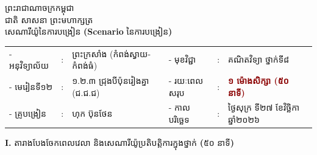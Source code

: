 \documentclass[a4paper,10pt]{article}
\newcommand{\enbf}[1]{{\TimesEn\textbf{#1}}}
\begin{document}
\fontsize{9.8pt}{14.6pt}\selectfont

\begin{center}
  {\muol\fontsize{11pt}{16pt}\selectfont ព្រះរាជាណាចក្រកម្ពុជា}\\[1pt]
  {\muol\fontsize{10pt}{15pt}\selectfont ជាតិ សាសនា ព្រះមហាក្សត្រ}\\[4pt]
  {\muol\fontsize{10.5pt}{15pt}\selectfont សេណារីយ៉ូនៃការបង្រៀន \enbf{(Scenario} នៃការបង្រៀន\enbf{)}}
\end{center}

\vspace{2pt}
{\renewcommand{\arraystretch}{1.06}
\begin{tabular}{@{}l l l p{0.6cm} l l l@{}}
  - អនុវិទ្យាល័យ & : & ព្រះក្រសាំង (កំពង់ស្វាយ-កំពង់ធំ) & & - មុខវិជ្ជា & : & គណិតវិទ្យា ថ្នាក់ទី៨ \\
  - មេរៀនទី១២ & : & ១.២.៣ ជ្រុងបីប៉ុនរៀងគ្នា (ជ.ជ.ជ) & & - រយៈពេលសរុប & : & \textcolor{darkred}{\textbf{១ ម៉ោងសិក្សា (៥០ នាទី)}} \\
  - គ្រូបង្រៀន & : & ហុក ប៊ុនថែន & & - កាលបរិច្ឆេទ & : & ថ្ងៃសុក្រ ទី២៧ ខែវិច្ឆិកា ឆ្នាំ២០២៦ \\
\end{tabular}
}

\vspace{3pt}

\textbf{I.} {\muol តារាងបែងចែកពេលវេលា និងសេណារីយ៉ូប្រតិបត្តិការក្នុងថ្នាក់ \enbf{(}៥០ នាទី\enbf{)}}
\end{document}
